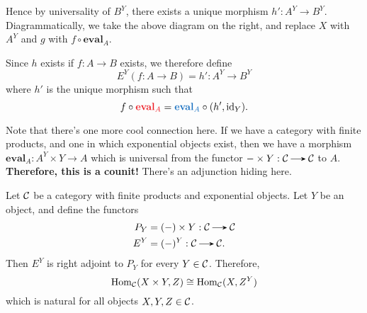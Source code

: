 \begin{definition}
\begin{description}
            Hence by universality
            of $B^Y$, there exists a unique morphism $h': A^Y \to B^Y$.
            Diagrammatically, we take the above diagram on the right, and
            replace $X$ with $A^Y$ and $g$ with $f \circ \textbf{eval}_A$.
            \begin{center}
                \hspace{0.5cm}
            \end{center}
            Since $h$ exists if $f: A \to B$ exists, we therefore define 
            \[
                E^Y(f: A \to B) = h': A^Y \to B^Y
            \]
            where $h'$ is the unique morphism such that 
            \[
                f \circ \textcolor{Red}{\textbf{eval}_A}
                = \textcolor{RoyalBlue}{\textbf{eval}_A} \circ (h', \id_Y).
            \]
        \end{description}    
    \end{definition}
    Note that there's one more cool connection here. If we have a
    category 
    with finite products, and one in which exponential objects exist,
    then we have a morphism $\textbf{eval}_A: A^Y \times Y
    \to A$ which is universal from the functor $-\times Y: \cc \to
    \cc$ 
    to $A$.
    \textbf{Therefore, this is a counit!} There's an adjunction hiding
    here. 

    \begin{proposition}
        Let $\mathcal{C}$ be a category with finite products and exponential
        objects. Let $Y$ be an object, and define the functors 
        \begin{align*}
            P_Y &= (-) \times Y: \cc \to \cc\\
            E^Y &= (-)^Y: \cc \to \cc.
        \end{align*}
        Then $E^Y$ is right adjoint to $P_Y$ for every $Y \in \mathcal{C}$.
        Therefore, 
        \[
            \operatorname{\mathrm{Hom}}_{\mathcal{C}}(X \times Y, Z) \cong \operatorname{\mathrm{Hom}}_{\mathcal{C}}(X, Z^Y)
        \]
        which is natural for all objects $X, Y, Z \in \mathcal{C}$. 
    \end{proposition}

